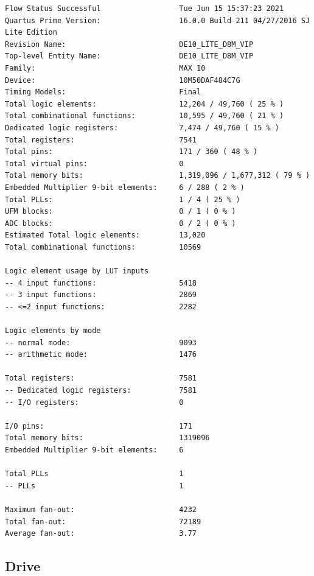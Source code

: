 \documentclass[11pt, a4paper]{article}
\begin{document}
\begin{verbatim}
Flow Status	Successful                  Tue Jun 15 15:37:23 2021
Quartus Prime Version:                  16.0.0 Build 211 04/27/2016 SJ Lite Edition
Revision Name:                          DE10_LITE_D8M_VIP
Top-level Entity Name:                  DE10_LITE_D8M_VIP
Family:                                 MAX 10
Device:                                 10M50DAF484C7G
Timing Models:                          Final
Total logic elements:                   12,204 / 49,760 ( 25 % )
Total combinational functions:          10,595 / 49,760 ( 21 % )
Dedicated logic registers:              7,474 / 49,760 ( 15 % )
Total registers:                        7541
Total pins:                             171 / 360 ( 48 % )
Total virtual pins:                     0
Total memory bits:                      1,319,096 / 1,677,312 ( 79 % )
Embedded Multiplier 9-bit elements:     6 / 288 ( 2 % )
Total PLLs:                             1 / 4 ( 25 % )
UFM blocks:                             0 / 1 ( 0 % )
ADC blocks:                             0 / 2 ( 0 % )
Estimated Total logic elements:         13,020
Total combinational functions:          10569

Logic element usage by LUT inputs	
-- 4 input functions:                   5418
-- 3 input functions:                   2869
-- <=2 input functions:                 2282

Logic elements by mode	
-- normal mode:                         9093
-- arithmetic mode:                     1476

Total registers:                        7581
-- Dedicated logic registers:           7581
-- I/O registers:                       0

I/O pins:                               171
Total memory bits:                      1319096
Embedded Multiplier 9-bit elements:     6

Total PLLs	                            1
-- PLLs	                                1

Maximum fan-out:                        4232
Total fan-out:                          72189
Average fan-out:                        3.77
\end{verbatim}




\pagebreak
\subsection{Drive}
\end{document}
